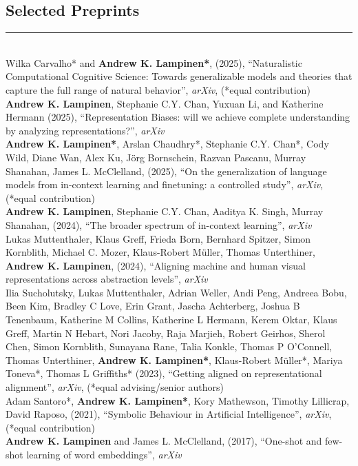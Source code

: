 \documentclass[margin]{res}
\begin{document}
\begin{resume}
\vspace{1pt}\section{Selected\phantom{blah} Preprints} \vspace{-15pt} \rule{\textwidth}{0.5pt} \\[3pt]
Wilka Carvalho* and \textbf{Andrew K. Lampinen*}, (2025), {``Naturalistic Computational Cognitive Science: Towards generalizable models and theories that capture the full range of natural behavior''}, \textit{arXiv}, (*equal contribution)\\[3pt]
\textbf{Andrew K. Lampinen}, Stephanie C.Y. Chan, Yuxuan Li, and Katherine Hermann (2025), {``Representation Biases: will we achieve complete understanding by analyzing representations?''}, \textit{arXiv}\\[3pt]
\textbf{Andrew K. Lampinen*}, Arslan Chaudhry*, Stephanie C.Y. Chan*, Cody Wild, Diane Wan, Alex Ku, Jörg Bornschein, Razvan Pascanu, Murray Shanahan, James L. McClelland, (2025), {``On the generalization of language models from in-context learning and finetuning: a controlled study'',} \textit{arXiv}, (*equal contribution)\\[3pt]
\textbf{Andrew K. Lampinen}, Stephanie C.Y. Chan, Aaditya K. Singh, Murray Shanahan, (2024), {``The broader spectrum of in-context learning''}, \textit{arXiv}\\[3pt]
Lukas Muttenthaler, Klaus Greff, Frieda Born, Bernhard Spitzer, Simon Kornblith, Michael C. Mozer, Klaus-Robert M{\"u}ller, Thomas Unterthiner, \textbf{Andrew K. Lampinen}, (2024), {``Aligning machine and human visual representations across abstraction levels'',} \textit{arXiv}\\[3pt] 
Ilia Sucholutsky, Lukas Muttenthaler, Adrian Weller, Andi Peng, Andreea Bobu, Been Kim, Bradley C Love, Erin Grant, Jascha Achterberg, Joshua B Tenenbaum, Katherine M Collins, Katherine L Hermann, Kerem Oktar, Klaus Greff, Martin N Hebart, Nori Jacoby, Raja Marjieh, Robert Geirhos, Sherol Chen, Simon Kornblith, Sunayana Rane, Talia Konkle, Thomas P O'Connell, Thomas Unterthiner, \textbf{Andrew K. Lampinen*}, Klaus-Robert M{\"u}ller*, Mariya Toneva*, Thomas L Griffiths* (2023), {``Getting aligned on representational alignment'',} \textit{arXiv}, (*equal advising/senior authors) \\[3pt]
Adam Santoro*, \textbf{Andrew K. Lampinen*}, Kory Mathewson, Timothy Lillicrap, David Raposo, (2021), {``Symbolic Behaviour in Artificial Intelligence'',} \textit{arXiv}, (*equal contribution) \\[3pt] 
\textbf{Andrew K. Lampinen} and James L. McClelland, (2017), {``One-shot and few-shot learning of word embeddings'',} \textit{arXiv} 


\end{resume}
\end{document}
